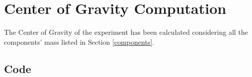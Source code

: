 

\newpage
\section{Center of Gravity Computation}



The Center of Gravity of the experiment has been calculated considering all the components' mass listed in Section \ref{components}.


\subsection{Code}










\newpage